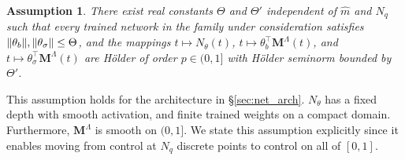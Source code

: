 \documentclass[11pt, a4paper]{article}
\theoremstyle{theoremstyle}
\theoremstyle{definitionstyle}
\newtheorem{assumption}[theorem]{Assumption}
\DeclarePairedDelimiter{\norm}{\lVert}{\rVert}
\begin{document}
\begin{assumption}\label{as:3.3}
    There exist real constants \(\Theta\) and \(\Theta'\) independent of \(\hat m\) and \(N_q\) such that every trained network in the family under consideration satisfies \(\norm{\theta_b}, \norm{\theta_\sigma} \leq \Theta\), and the mappings \(t \mapsto N_\theta(t)\), \(t \mapsto \theta_b^\top \mathbf M^\Lambda(t)\), and \(t \mapsto \theta_\sigma^\top \mathbf M^\Lambda (t)\) are H\"older of order \(p \in (0, 1]\) with H\"older seminorm bounded by \(\Theta'\).
\end{assumption}
This assumption holds for the architecture in \S\ref{sec:net_arch}. \(N_\theta\) has a fixed depth with smooth activation, and finite trained weights on a compact domain. Furthermore, \(\mathbf M^\Lambda\) is smooth on \((0, 1]\). We state this assumption explicitly since it enables moving from control at \(N_q\) discrete points to control on all of \([0, 1]\).
\end{document}
